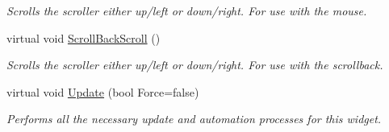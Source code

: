 \begin{DoxyCompactItemize}
\begin{DoxyCompactList}\small\item\em Scrolls the scroller either up/left or down/right. For use with the mouse. \item\end{DoxyCompactList}\item 
\hypertarget{classphys_1_1UI_1_1Scrollbar_a1c6ca6b135d09d284b31fda2230c9286}{
virtual void \hyperlink{classphys_1_1UI_1_1Scrollbar_a1c6ca6b135d09d284b31fda2230c9286}{ScrollBackScroll} ()}
\label{d0/d3e/classphys_1_1UI_1_1Scrollbar_a1c6ca6b135d09d284b31fda2230c9286}

\begin{DoxyCompactList}\small\item\em Scrolls the scroller either up/left or down/right. For use with the scrollback. \item\end{DoxyCompactList}\item 
\hypertarget{classphys_1_1UI_1_1Scrollbar_a628999b4caa32f3c273d45e64d5c62a0}{
virtual void \hyperlink{classphys_1_1UI_1_1Scrollbar_a628999b4caa32f3c273d45e64d5c62a0}{Update} (bool Force=false)}
\label{d0/d3e/classphys_1_1UI_1_1Scrollbar_a628999b4caa32f3c273d45e64d5c62a0}

\begin{DoxyCompactList}\small\item\em Performs all the necessary update and automation processes for this widget. \item\end{DoxyCompactList}\end{DoxyCompactItemize}
